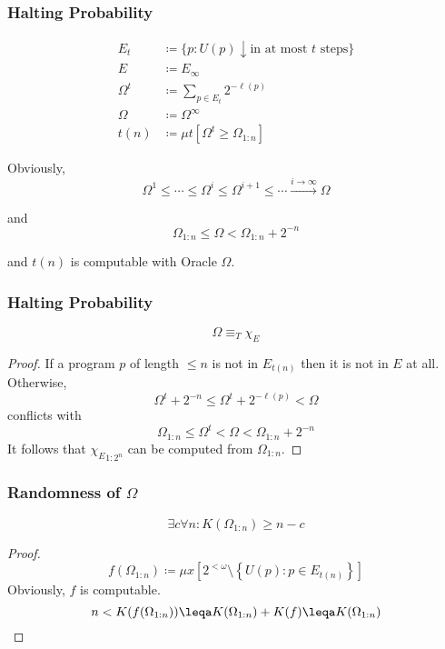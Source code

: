 \documentclass[UTF8,aspectratio=43,11pt,colorlinks,compress,openany]{beamer}%
\begin{document}
\begin{frame}\frametitle{Halting Probability}
\setlength\abovedisplayskip{0pt}
\setlength\belowdisplayskip{0pt}
	\begin{definition}
		\begin{align*}
		E_t &\coloneqq \big\{p: U(p)\downarrow \text{in at most $t$ steps}\big\}\\
		E &\coloneqq E_\infty\\
		\Omega^t &\coloneqq \sum\limits_{p\in E_t}2^{-\ell(p)}\\
		\Omega &\coloneqq \Omega^\infty\\
		t(n) &\coloneqq \mu t[\Omega^t\geq\Omega_{1:n}]
		\end{align*}
	\end{definition}
	Obviously,\[\Omega^1\leq\cdots\leq\Omega^i\leq\Omega^{i+1}\leq\cdots\xrightarrow{i\to\infty}\Omega\]
	
	and \[\Omega_{1:n}\leq\Omega<\Omega_{1:n}+2^{-n}\]
	
	and $t(n)$ is computable with Oracle $\Omega$.
\end{frame}

\begin{frame}\frametitle{Halting Probability}
\setlength\abovedisplayskip{0pt}
\setlength\belowdisplayskip{0pt}
	\begin{lemma}
		\[\Omega\equiv_T\chi_E\]
	\end{lemma}
	\begin{proof}
		If a program $p$ of length $\leq n$ is not in $E_{t(n)}$ then it is not in $E$ at all. Otherwise, \[\Omega^t+2^{-n}\leq\Omega^t+2^{-\ell(p)}<\Omega\] conflicts with \[\Omega_{1:n}\leq\Omega^t<\Omega<\Omega_{1:n}+2^{-n}\]
		It follows that ${\chi_E}_{1:2^n}$ can be computed from $\Omega_{1:n}$.
	\end{proof}
\end{frame}

\begin{frame}\frametitle{Randomness of $\Omega$}
	\begin{theorem}
		\[\exists c\forall n: K(\Omega_{1:n})\geq n-c\]
	\end{theorem}
	\begin{proof}
		\[f(\Omega_{1:n})\coloneqq \mu x\left[2^{<\omega}\setminus\left\{U(p): p\in E_{t(n)}\right\}\right]\]
		Obviously, $f$ is computable.
		\[n<K(f(\Omega_{1:n}))\leqa K(\Omega_{1:n})+K(f)\leqa K(\Omega_{1:n})\]
	\end{proof}
\end{frame}
\end{document}
